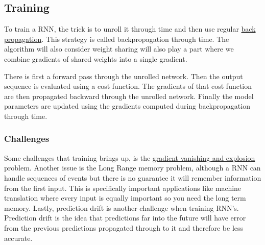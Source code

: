\documentclass[12pt]{article}
\begin{document}
    \subsection{Training}
        To train a RNN, the trick is to unroll it through time and then use regular \hyperref[sec:Backprop]{back
        propagation}. This strategy is called backpropagation through time. The algorithm will also consider weight sharing will also play a part where
        we combine gradients of shared weights into a single gradient. 
        
        There is first a forward pass through the unrolled network. Then the output sequence is evaluated using a cost
        function. The gradients of that cost function are then propagated backward through the unrolled network. Finally
        the model parameters are updated using the gradients computed during backpropagation through time. 

        \subsubsection{Challenges}
            Some challenges that training brings up, is the \hyperref[sec:VanishingProblem]{gradient vanishing and
            explosion} problem. Another issue is the Long Range memory problem, although a RNN can handle sequences of events
            but there is no guarantee it will remember information from the first input. This is specifically important
            applications like machine translation where every input is equally important so you need the long term memory.
            Lastly, prediction drift is another challenge when training RNN's. Prediction drift is the idea that predictions
            far into the future will have error from the previous predictions propagated through to it and therefore be
            less accurate.
\printindex
\end{document}
